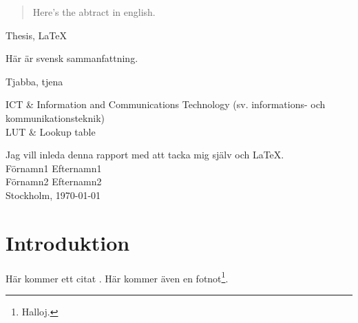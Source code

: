 \def \pdf {cover.pdf}					%




\postbegindocument


\begin{abstract}
Here's the abtract in english.
\end{abstract}

\begin{keywords}
Thesis, \LaTeX
\end{keywords}

\begin{sammanfattning}
Här är svensk sammanfattning.
\end{sammanfattning}

\begin{nyckelord}
Tjabba, tjena
\end{nyckelord}

\tableofcontents
\clearpage

\begin{definitioner}
ICT & Information and Communications Technology (sv. informations- och kommunikationsteknik)\\
LUT & Lookup table
\end{definitioner}

\begin{foerord}
Jag vill inleda denna rapport med att tacka mig själv och \LaTeX.\\[2cm]
Förnamn1 Efternamn1\\
Förnamn2 Efternamn2\\
Stockholm, \monthyeardate\today\\
\end{foerord}

\section{Introduktion}
Här kommer ett citat \cite{exempelreferens}. Här kommer även en fotnot\footnote{Halloj.}.

